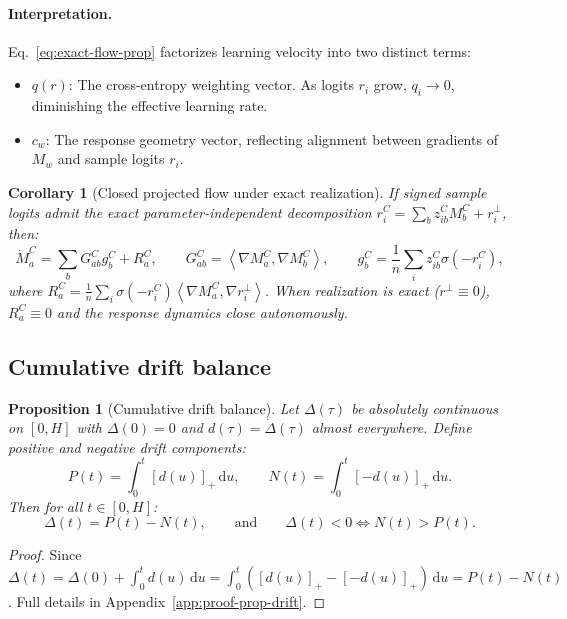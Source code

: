 \documentclass{article}
\newtheorem{corollary}{Corollary}
\newtheorem{proposition}{Proposition}
\theoremstyle{definition}
\theoremstyle{remark}
\newcommand{\ip}[2]{\left\langle #1,#2\right\rangle}
\newcommand{\sigm}{\sigma}
\newcommand{\dd}{\,\mathrm{d}}
\begin{document}
\paragraph{Interpretation.}
Eq.~\eqref{eq:exact-flow-prop} factorizes learning velocity into two distinct terms:
\begin{itemize}[leftmargin=*]
  \item $q(r)$: The cross-entropy weighting vector. As logits $r_i$ grow, $q_i \to 0$, diminishing the effective learning rate.
  \item $c_w$: The response geometry vector, reflecting alignment between gradients of $M_w$ and sample logits $r_i$.
\end{itemize}

\begin{corollary}[Closed projected flow under exact realization]
\label{cor:projected-flow}
If signed sample logits admit the exact parameter-independent decomposition $r_i^C = \sum_b z_{ib}^C M_b^C + r_i^\perp$, then:
\begin{equation}
  \dot{M}_a^C = \sum_b G_{ab}^C g_b^C + R_a^C, \qquad G_{ab}^C = \ip{\nabla M_a^C}{\nabla M_b^C}, \qquad g_b^C = \frac{1}{n} \sum_i z_{ib}^C \sigm(-r_i^C),
  \label{eq:projected-dynamics}
\end{equation}
where $R_a^C = \frac{1}{n} \sum_i \sigm(-r_i^C) \ip{\nabla M_a^C}{\nabla r_i^\perp}$. When realization is exact ($r^\perp \equiv 0$), $R_a^C \equiv 0$ and the response dynamics close autonomously.
\end{corollary}

\subsection{Cumulative drift balance}
\begin{proposition}[Cumulative drift balance]
\label{prop:cumulative-drift}
Let $\Delta(\tau)$ be absolutely continuous on $[0, H]$ with $\Delta(0) = 0$ and $d(\tau) = \dot{\Delta}(\tau)$ almost everywhere. Define positive and negative drift components:
\begin{equation}
  P(t) = \int_0^t [d(u)]_+ \dd u, \qquad N(t) = \int_0^t [-d(u)]_+ \dd u.
  \label{eq:pn-def}
\end{equation}
Then for all $t \in [0, H]$:
\begin{equation}
  \Delta(t) = P(t) - N(t), \qquad \text{and} \qquad \Delta(t) < 0 \iff N(t) > P(t).
  \label{eq:pathwise-identity}
\end{equation}
\end{proposition}
\begin{proof}
Since $\Delta(t) = \Delta(0) + \int_0^t d(u) \dd u = \int_0^t ([d(u)]_+ - [-d(u)]_+) \dd u = P(t) - N(t)$. Full details in Appendix~\ref{app:proof-prop-drift}.
\end{proof}
\end{document}
